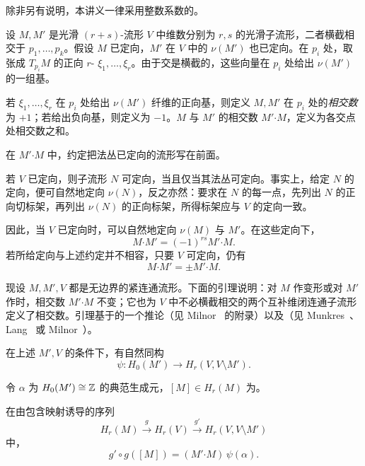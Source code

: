 
除非另有说明，本讲义一律采用整数系数的。

设 $M,M'$ 是光滑 $(r+s)$-流形 $V$ 中维数分别为 $r,s$ 的光滑子流形，二者横截相交于 $p_1,\ldots,p_k$。假设 $M$ 已定向，$M'$ 在 $V$ 中的 $\nu(M')$ 也已定向。在 $p_i$ 处，取张成 $T_{p_i}M$ 的正向 $r$- $\xi_1,\ldots,\xi_r$。由于交是横截的，这些向量在 $p_i$ 处给出 $\nu(M')$ 的一组基。

若 $\xi_1,\ldots,\xi_r$ 在 $p_i$ 处给出 $\nu(M')$ 纤维的正向基，则定义 $M,M'$ 在 $p_i$ 处的\emph{相交数}为 $+1$；若给出负向基，则定义为 $-1$。$M$ 与 $M'$ 的相交数 $M'\mathbin{\boldsymbol\cdot}M$，定义为各交点处相交数之和。

在 $M'\mathbin{\boldsymbol\cdot}M$ 中，约定把法丛已定向的流形写在前面。

\label{rem:6-1-2}若 $V$ 已定向，则子流形 $N$ 可定向，当且仅当其法丛可定向。事实上，给定 $N$ 的定向，便可自然地定向 $\nu(N)$，反之亦然：要求在 $N$ 的每一点，先列出 $N$ 的正向切标架，再列出 $\nu(N)$ 的正向标架，所得标架应与 $V$ 的定向一致。

因此，当 $V$ 已定向时，可以自然地定向 $\nu(M)$ 与 $M'$。在这些定向下，
\[
  M\mathbin{\boldsymbol\cdot}M'
  =(-1)^{rs}M'\mathbin{\boldsymbol\cdot}M.
\]
若所给定向与上述约定并不相容，只要 $V$ 可定向，仍有
\[
  M\mathbin{\boldsymbol\cdot}M'
  =\pm M'\mathbin{\boldsymbol\cdot}M.
\]

现设 $M,M',V$ 都是无边界的紧连通流形。下面的引理说明：对 $M$ 作变形或对 $M'$ 作时，相交数 $M'\mathbin{\boldsymbol\cdot}M$ 不变；它也为 $V$ 中不必横截相交的两个互补维闭连通子流形定义了相交数。引理基于的一个推论（见 Milnor~\cite{ref19} 的附录）以及（见 Munkres~\cite[p.~46]{ref05}、Lang~\cite[p.~73]{ref03} 或 Milnor~\cite[p.~19]{ref12}）。

在上述 $M',V$ 的条件下，有自然同构
\[
  \psi:H_0(M')\longrightarrow H_r(V,V\setminus M').
\]

令 $\alpha$ 为 $H_0(M')\cong\mathbb{Z}$ 的典范生成元，$[M]\in H_r(M)$ 为。

在由包含映射诱导的序列
\[
  H_r(M)\xrightarrow{g}H_r(V)
  \xrightarrow{g'}H_r(V,V\setminus M')
\]
中，
\[
  g'\circ g([M])
  =(M'\mathbin{\boldsymbol\cdot}M)\,\psi(\alpha).
\]

